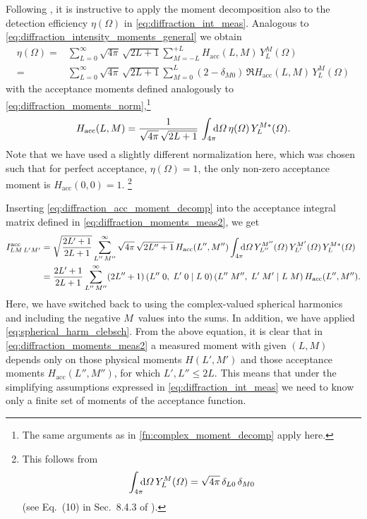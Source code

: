Following , it is instructive to apply the
moment decomposition also to the detection efficiency $\eta(\Omega)$
in \cref{eq:diffraction_int_meas}.  Analogous to
\cref{eq:diffraction_intensity_moments_general} we obtain
\begin{align}
  \label{eq:diffraction_acc_moment_decomp}
  \eta(\Omega)
  ={}& \sum_{L = 0}^\infty \sqrt{4 \pi}\, \sqrt{2 L + 1} \sum_{M = -L}^{+L} H_\text{acc}(L, M)\, Y_L^M(\Omega)
  \\
  ={}& \sum_{L = 0}^\infty \sqrt{4 \pi}\, \sqrt{2 L + 1} \sum_{M = 0}^{L} (2 - \delta_{M 0})\, \Re{H_\text{acc}(L, M)\, Y_L^M(\Omega)}
\end{align}
with the acceptance moments defined analogously to
\cref{eq:diffraction_moments_norm},\footnote{The same arguments as in
\cref{fn:complex_moment_decomp} apply here.} \ie
\begin{equation}
  \label{eq:diffraction_acc_moment}
  H_\text{acc}(L, M)
  = \frac{1}{\sqrt{4 \pi}\, \sqrt{2 L + 1}}\, \int_{4 \pi}\!\!\! \dif{\Omega}\, \eta(\Omega)\, Y_L^{M *}(\Omega).
\end{equation}
Note that we have used a slightly different normalization here, which
was chosen such that for perfect acceptance, \ie $\eta(\Omega) = 1$,
the only non-zero acceptance moment is $H_\text{acc}(0, 0) = 1$.%
\footnote{%
  This follows from
  \begin{equation}
    \int_{4 \pi}\!\!\! \dif{\Omega}\, Y_L^M(\Omega)
    = \sqrt{4 \pi}\, \delta_{L 0}\, \delta_{M 0}
  \end{equation}
  (see Eq.~(10) in Sec.~8.4.3 of ).}

Inserting \cref{eq:diffraction_acc_moment_decomp} into the acceptance
integral matrix defined in \cref{eq:diffraction_moments_meas2}, we get
\begin{align}
  I^\text{acc}_{L M\, L' M'}
  ={}& \sqrt{\frac{2 L' + 1}{2 L + 1}} \sum_{L''\, M''}^\infty \sqrt{4 \pi}\, \sqrt{2 L'' + 1}\, H_\text{acc}(L'', M'')
  \int_{4 \pi}\!\!\! \dif{\Omega}\, Y_{L''}^{M''}(\Omega)\, Y_{L'}^{M'}(\Omega)\, Y_L^{M *}(\Omega) \nonumber
  \\
  \label{eq:diffraction_acc_int_moment_decomp}
  ={}& \frac{2 L' + 1}{2 L + 1} \sum_{L''\, M''}^\infty (2 L'' + 1)\,
  \clebsch{L''}{0}{L'}{0}{L}{0}\, \clebsch{L''}{M''}{L'}{M'}{L}{M}\, H_\text{acc}(L'', M'').
\end{align}
Here, we have switched back to using the complex-valued spherical
harmonics and including the negative $M$~values into the sums.  In
addition, we have applied \cref{eq:spherical_harm_clebsch}.
From the above equation, it is clear that in
\cref{eq:diffraction_moments_meas2} a measured moment with given $(L,
M)$ depends only on those physical moments $H(L', M')$ and those
acceptance moments $H_\text{acc}(L'', M'')$, for which $L', L'' \leq 2
L$.  This means that under the simplifying assumptions expressed in
\cref{eq:diffraction_int_meas} we need to know only a finite set of
moments of the acceptance function.


